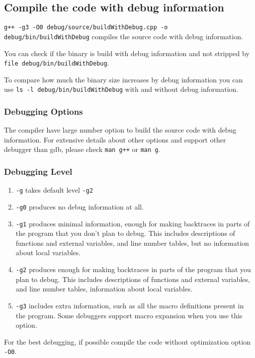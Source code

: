 \subsection{Compile the code with debug information}
\texttt{g++ -g3 -O0 debug/source/buildWithDebug.cpp -o debug/bin/buildWithDebug} compiles the source code with debug information.


You can check if the binary is build with debug information and not stripped by \texttt{file debug/bin/buildWithDebug}.

To compare how much the binary size increases by debug information you can use \texttt{ls -l debug/bin/buildWithDebug} with and without debug information.


\subsubsection{Debugging Options}
The compiler have large number option to build the source code with debug information.
For extensive details about other options and support other debugger than gdb, please check \texttt{man g++} or \texttt{man g}.

\subsubsection{Debugging Level}
\begin{enumerate}
  \item \texttt{-g} takes default level \texttt{-g2}
  \item \texttt{-g0} produces no debug information at all.
  \item \texttt{-g1} produces minimal information, enough for making backtraces in parts of the program that you don't plan to debug.  This includes descriptions of functions and external variables, and line number tables, but no information about local variables.
  \item \texttt{-g2} produces enough for making backtraces in parts of the program that you  plan to debug.  This includes descriptions of functions and external variables, and line number tables, information about local variables.
  \item \texttt{-g3} includes extra information, such as all the macro definitions present in the program.  Some debuggers support macro expansion when you use this option.
\end{enumerate}

For the best debugging, if possible compile the code without optimization option \texttt{-O0}.


